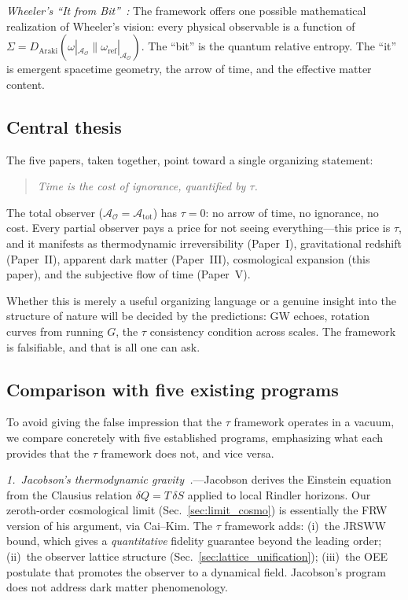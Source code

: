 \documentclass[prd,twocolumn,superscriptaddress,longbibliography,floatfix]{revtex4-2}
\newcommand{\tauasym}{\tau}
\newcommand{\Daraki}{D_{\mathrm{Araki}}}
\newcommand{\Aobs}{\mathcal{A}_{\mathcal{O}}}
\newcommand{\Atot}{\mathcal{A}_{\mathrm{tot}}}
\begin{document}
\emph{Wheeler's ``It from Bit''~\cite{Wheeler1990}:}
The framework offers one possible mathematical realization
of Wheeler's vision:
every physical observable is a function of
$\Sigma = \Daraki(\omega|_{\Aobs}\|
\omega_{\mathrm{ref}}|_{\Aobs})$.
The ``bit'' is the quantum relative entropy.
The ``it'' is emergent spacetime geometry, the arrow
of time, and the effective matter content.

\subsection{Central thesis}

The five papers, taken together, point toward a single
organizing statement:
\begin{quote}
\emph{Time is the cost of ignorance, quantified by
$\tauasym$.}
\end{quote}
The total observer ($\Aobs = \Atot$) has $\tauasym = 0$:
no arrow of time, no ignorance, no cost.
Every partial observer pays a price for not seeing
everything---this price is $\tauasym$, and it manifests
as thermodynamic irreversibility (Paper~I), gravitational
redshift (Paper~II), apparent dark matter (Paper~III),
cosmological expansion (this paper), and the subjective
flow of time (Paper~V).

Whether this is merely a useful organizing language or a
genuine insight into the structure of nature will be
decided by the predictions: GW echoes, rotation curves
from running $G$, the $\tauasym$ consistency condition
across scales.  The framework is falsifiable, and
that is all one can ask.


\subsection{Comparison with five existing programs}

To avoid giving the false impression that the
$\tauasym$ framework operates in a vacuum, we
compare concretely with five established programs,
emphasizing what each provides that the $\tauasym$
framework does not, and vice versa.

\emph{1.\ Jacobson's thermodynamic
gravity~\cite{Jacobson1995,Jacobson2016}.}---Jacobson
derives the Einstein equation from the Clausius
relation $\delta Q = T\,\delta S$ applied to local
Rindler horizons.  Our zeroth-order cosmological
limit (Sec.~\ref{sec:limit_cosmo}) is essentially
the FRW version of his argument, via Cai--Kim.
The $\tauasym$ framework adds: (i)~the JRSWW bound,
which gives a \emph{quantitative} fidelity guarantee
beyond the leading order; (ii)~the observer lattice
structure (Sec.~\ref{sec:lattice_unification});
(iii)~the OEE postulate that promotes the observer
to a dynamical field.  Jacobson's program does not
address dark matter phenomenology.
\end{document}

